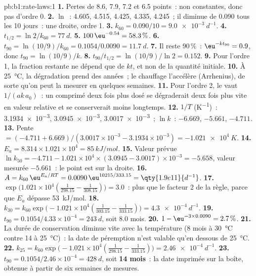 \begin{solution}{pb:b1:rate-laws:1}
\textbf{1.} Pertes de 8.6, 7.9, 7.2 et 6.5 points~: non constantes, donc
pas d'ordre 0.
\textbf{2.} $\ln$~: 4.605, 4.515, 4.425, 4.335, 4.245~; il diminue de
0.090 tous les 10 jours~: une droite, ordre 1.
\textbf{3.} $k_{60} = 0.090/10 = \qty{9.0e-3}{d^{-1}}$.
\textbf{4.} $t_{1/2} = \ln2/k_{60} = \qty{77}{d}$.
\textbf{5.} $100\,\eu^{-0.54} = 58.3\,\%$.
\textbf{6.} $t_{90} = \ln(10/9)/k_{60} = 0.1054/0.0090 = \qty{11.7}{d}$.
\textbf{7.} Il reste 90\,\%~: $\eu^{-kt_{90}} = 0.9$, donc
$t_{90} = \ln(10/9)/k$.
\textbf{8.} $t_{90}/t_{1/2} = \ln(10/9)/\ln2 = 0.152$.
\textbf{9.} Pour l'ordre 1, la fraction restante ne dépend que de $kt$,
et non de la quantité initiale.
\textbf{10.} À \qty{25}{\celsius}, la dégradation prend des années~; le
chauffage l'accélère (Arrhenius), de sorte qu'on peut la mesurer en
quelques semaines.
\textbf{11.} Pour l'ordre 2, le  vaut
$1/(ak\,a_0)$~: un comprimé deux fois plus dosé se dégraderait deux fois
plus vite en valeur relative et se conserverait moins longtemps.
\textbf{12.} $1/T$ (\unit{K^{-1}})~: \num{3.1934e-3}, \num{3.0945e-3},
\num{3.0017e-3}~; $\ln k$~: $-6.669$, $-5.661$, $-4.711$.
\textbf{13.} Pente $= (-4.711 + 6.669)/(3.0017 \times 10^{-3} - 3.1934 \times
10^{-3}) = \qty{-1.021e4}{K}$.
\textbf{14.} $E_a = 8.314 \times 1.021 \times 10^4 = \qty{85}{kJ/mol}$.
\textbf{15.} Valeur prévue $\ln k_{50} = -4.711 - 1.021 \times 10^4 \times (3.0945 -
3.0017) \times 10^{-3} = -5.658$, valeur mesurée $-5.661$~: le point est
sur la droite.
\textbf{16.} $A = k_{60}\,\eu^{E_a/RT} = 0.0090\,\eu^{10215/333.15} =
\qty{1.9e11}{d^{-1}}$.
\textbf{17.} $\exp\big(1.021 \times 10^4(\frac{1}{298.15} -
\frac{1}{308.15})\big) = 3.0$~: plus que le facteur 2 de la règle, parce
que $E_a$ dépasse \qty{53}{kJ/mol}.
\textbf{18.} $k_{30} = k_{60}\exp\big(-1.021 \times 10^4(\frac{1}{303.15} -
\frac{1}{333.15})\big) = \qty{4.3e-4}{d^{-1}}$.
\textbf{19.} $t_{90} = 0.1054/4.33 \times 10^{-4} = \qty{243}{d}$, soit
8.0 mois.
\textbf{20.} $1 - \eu^{-3 \times 0.0090} = 2.7\,\%$.
\textbf{21.} La durée de conservation diminue vite avec la température (8
mois à \qty{30}{\celsius} contre 14 à \qty{25}{\celsius})~: la date de
péremption n'est valable qu'en dessous de \qty{25}{\celsius}.
\textbf{22.} $k_{25} = k_{60}\exp\big(-1.021 \times 10^4(\frac{1}{298.15} -
\frac{1}{333.15})\big) = \qty{2.46e-4}{d^{-1}}$.
\textbf{23.} $t_{90} = 0.1054/2.46 \times 10^{-4} = \qty{428}{d}$, soit
\textbf{14 mois}~: la date imprimée sur la boîte, obtenue à partir de six
semaines de mesures.
\end{solution}
